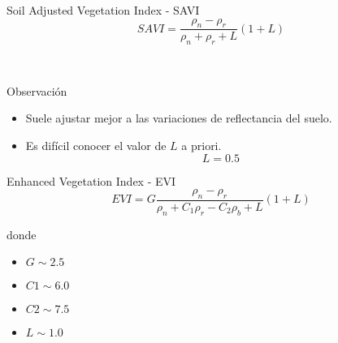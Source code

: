 \begin{frame}{}
    \begin{block}{Soil Adjusted Vegetation Index - SAVI}
        \begin{equation}
            SAVI = \frac{\rho_n-\rho_r}{\rho_n+\rho_r+L}(1+L)
        \end{equation}
    \end{block}\pause\
    \begin{block}{Observación}
        \begin{itemize}[<+->]
            \item Suele ajustar mejor a las variaciones de reflectancia del
                suelo.
            \item Es difícil conocer el valor de $L$ a priori. \begin{equation}
        L=0.5
    \end{equation}
        \end{itemize}
    \end{block}
\end{frame}

\begin{frame}{}
    \begin{block}{Enhanced Vegetation Index - EVI}
        \begin{equation}
            EVI = G\frac{\rho_n - \rho_r}{\rho_n+C_1\rho_r-C_2\rho_b+L}(1+L)
        \end{equation}
    \end{block}
    donde
    \begin{itemize}
        \item $G  \sim 2.5$
        \item $C1 \sim 6.0$
        \item $C2 \sim 7.5$
        \item $L  \sim 1.0$
    \end{itemize}
\end{frame}

\gracias
